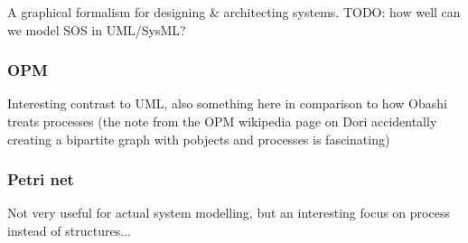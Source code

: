 \documentclass[12pt]{article}
\begin{document}
A graphical formalism for designing \& architecting systems. TODO: how well can
we model SOS in  UML/SysML?

\subsubsection{OPM}   

Interesting contrast to UML, also something here in
comparison to how Obashi treats processes (the note from                        
the OPM wikipedia page on Dori accidentally creating a                          
bipartite graph with pobjects and processes is fascinating)                     


\subsubsection{Petri net}

Not very useful for actual system modelling, but
an interesting focus on process instead of
structures...

\end{document}
